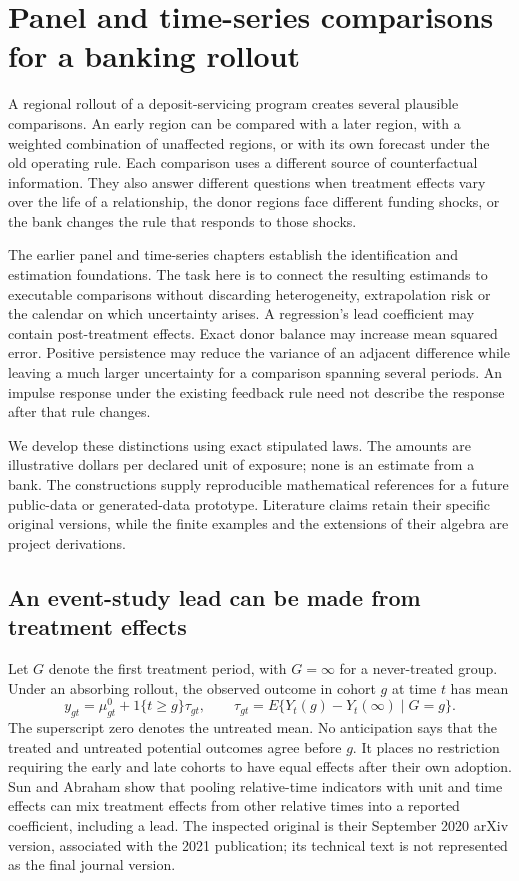 \chapter{Panel and time-series comparisons for a banking rollout}
\label{exec17:s6}

A regional rollout of a deposit-servicing program creates several plausible
comparisons. An early region can be compared with a later region, with a
weighted combination of unaffected regions, or with its own forecast under the
old operating rule. Each comparison uses a different source of counterfactual
information. They also answer different questions when treatment effects
vary over the life of a relationship, the donor regions face different funding
shocks, or the bank changes the rule that responds to those shocks.

The earlier panel and time-series chapters establish the identification and
estimation foundations. The task here is to connect the resulting estimands
to executable comparisons without discarding heterogeneity, extrapolation risk
or the calendar on which uncertainty arises. A regression's lead coefficient
may contain post-treatment effects. Exact donor balance may increase mean
squared error. Positive persistence may reduce the variance of an adjacent
difference while leaving a much larger uncertainty for a comparison spanning
several periods. An impulse response under the existing feedback rule need
not describe the response after that rule changes.

We develop these distinctions using exact stipulated laws. The amounts are
illustrative dollars per declared unit of exposure; none is an estimate from
a bank. The constructions supply reproducible mathematical references for a
future public-data or generated-data prototype. Literature claims retain their
specific original versions, while the finite examples and the extensions of
their algebra are project derivations.\citep{exec17_s6_math}

\section{An event-study lead can be made from treatment effects}
\label{exec17:s6-event}

Let $G$ denote the first treatment period, with $G=\infty$ for a never-treated
group. Under an absorbing rollout, the observed outcome in cohort $g$ at time
$t$ has mean
\begin{equation}
 y_{gt}=\mu_{gt}^{0}+1\{t\geq g\}\tau_{gt},
 \qquad \tau_{gt}=E\{Y_t(g)-Y_t(\infty)\mid G=g\}.
 \label{exec17:s6-cohort-law}
\end{equation}
The superscript zero denotes the untreated mean. No anticipation says that
the treated and untreated potential outcomes agree before $g$. It places no
restriction requiring the early and late cohorts to have equal effects after
their own adoption. Sun and Abraham show that pooling relative-time
indicators with unit and time effects can mix treatment effects from other
relative times into a reported coefficient, including a lead. The inspected
original is their September 2020 arXiv version, associated with the 2021
publication; its technical text is not represented as the final journal
version.\citep{sun2021}

